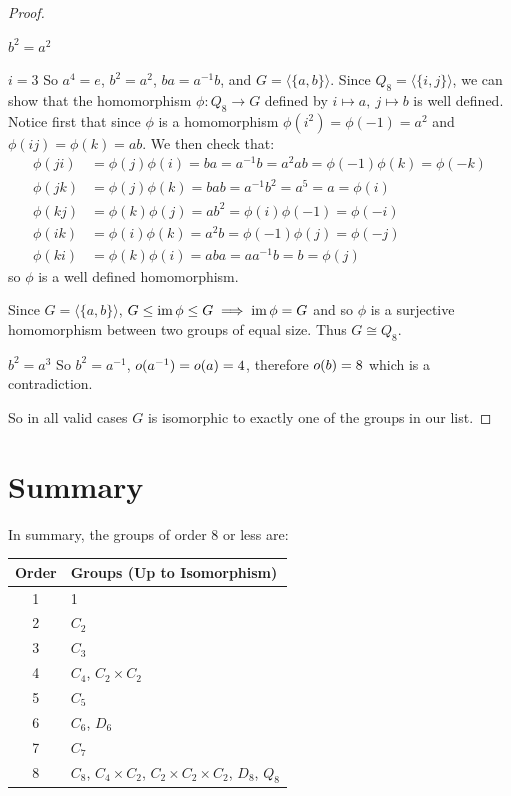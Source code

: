 \documentclass[../main.tex]{subfiles}
\begin{document}
\begin{proof}
\begin{proofcases}
\begin{case}{$b^2 = a^2$}
\begin{proofcases}
\begin{case}{$i = 3$}
          So $a^4 = e$, $b^2 = a^2$, $ba = a^{-1}b$, and $G = \langle \{a, b\} \rangle$.
          Since $Q_8 = \langle \{i, j\} \rangle$, we can show that the homomorphism $\phi: Q_8 \to G$ defined by $i \mapsto a,\ j \mapsto b$ is well defined.
          Notice first that since $\phi$ is a homomorphism $\phi(i^2) = \phi(-1) = a^2$ and $\phi(ij) = \phi(k) = ab$.
          We then check that:
          \begin{align*}
            \phi(ji) &= \phi(j)\phi(i) = ba = a^{-1}b = a^2 ab = \phi(-1)\phi(k) = \phi(-k) \\
            \phi(jk) &= \phi(j)\phi(k) = bab = a^{-1}b^2 = a^{5} = a = \phi(i) \\
            \phi(kj) &= \phi(k)\phi(j) = ab^2 = \phi(i)\phi(-1) = \phi(-i) \\
            \phi(ik) &= \phi(i)\phi(k) = a^2b = \phi(-1)\phi(j) = \phi(-j) \\
            \phi(ki) &= \phi(k)\phi(i) = aba = a a^{-1}b = b = \phi(j)
          \end{align*}
          so $\phi$ is a well defined homomorphism.

          Since $G = \langle \{a, b\} \rangle$, $G \leq \operatorname{im} \phi \leq G \implies \operatorname{im} \phi = G$ and so $\phi$ is a surjective homomorphism between two groups of equal size.
          Thus $G \cong Q_8$.
        \end{case}
      \end{proofcases}
    \end{case}
    \begin{case}{$b^2 = a^3$}
      So $b^2 = a^{-1}$, $o(a^{-1}) = o(a) = 4$, therefore $o(b) = 8$ which is a contradiction.
    \end{case}
  \end{proofcases}
  So in all valid cases $G$ is isomorphic to exactly one of the groups in our list.
\end{proof}
\section{Summary}
In summary, the groups of order 8 or less are:
\begin{center}
\begin{tabular}{c|l}
Order & Groups (Up to Isomorphism) \\
\hline
1 & 1 \\
2 & $C_2$ \\
3 & $C_3$ \\
4 & $C_4$, $C_2 \times C_2$ \\
5 & $C_5$ \\
6 & $C_6$, $D_6$ \\
7 & $C_7$ \\
8 & $C_8$, $C_4 \times C_2$, $C_2 \times C_2 \times C_2$, $D_8$, $Q_8$
\end{tabular}
\end{center}
\end{document}
